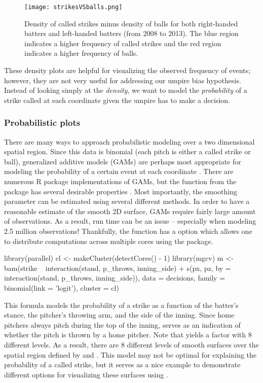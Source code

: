 \begin{article}
\begin{figure}[h]
\centerline{\texttt{[image: strikesVSballs.png]}}
\caption{\label{fig:strikesVSballs} Density of called strikes minus density
of balls for both right-handed batters and left-handed batters (from
2008 to 2013). The blue region indicates a higher frequency of called
strikes and the red region indicates a higher frequency of balls.}
\end{figure}

These density plots are helpful for visualizing the observed frequency
of events; however, they are not very useful for addressing our umpire
bias hypothesis. Instead of looking simply at the \emph{density},
we want to model the \emph{probability} of a strike called at each
coordinate given the umpire has to make a decision. 

\subsubsection{Probabilistic plots}

There are many ways to approach probabilistic modeling over a two
dimensional spatial region. Since this data is binomial (each pitch
is either a called strike or ball), generalized additive models (GAMs)
are perhaps most appropriate for modeling the probability of a certain
event at each coordinate \citep{loess}. There are numerous R
package implementations of GAMs, but the  function from
the  package has several desirable properties \citep{mgcv}.
Most importantly, the smoothing parameter can be estimated using several
different methods. In order to have a reasonable estimate of the smooth
2D surface, GAMs require fairly large amount of observations. As a
result, run time can be an issue -- especially when modeling 2.5 million
observations! Thankfully, the  function has a 
option which allows one to distribute computations across multiple
cores using the  package.
%
\begin{Schunk}
\begin{Sinput}
library(parallel) 
cl <- makeCluster(detectCores() - 1)
library(mgcv) 
m <- bam(strike ~ interaction(stand, p_throws, inning_side) +                
  s(px, pz, by = interaction(stand, p_throws, inning_side)),              
  data = decisions, family = binomial(link = 'logit'), cluster = cl)
\end{Sinput}
\end{Schunk}
%
This formula models the probability of a strike as a function of the
batter's stance, the pitcher's throwing arm, and the side of the inning.
Since home pitchers always pitch during the top of the inning, 
serves as an indication of whether the pitch is thrown by a home pitcher.
Note that  yields
a factor with 8 different levels. As a result, there are 8 different
levels of smooth surfaces over the spatial region defined by 
and . This model may not be optimal for explaining the probability
of a called strike, but it serves as a nice example to demonstrate
different options for visualizing these surfaces using . 


\end{article}
